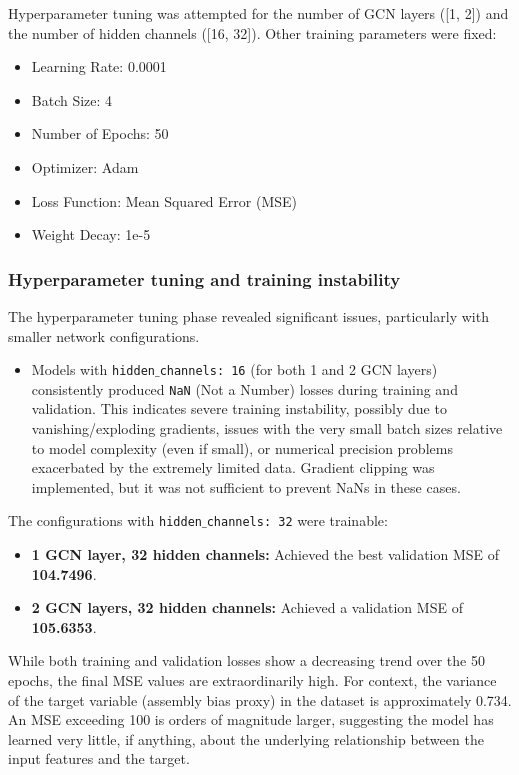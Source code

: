\documentclass[twocolumn]{aastex631}
\begin{document}
Hyperparameter tuning was attempted for the number of GCN layers ([1, 2]) and the number of hidden channels ([16, 32]). Other training parameters were fixed:
\begin{itemize}
    \item Learning Rate: 0.0001
    \item Batch Size: 4
    \item Number of Epochs: 50
    \item Optimizer: Adam
    \item Loss Function: Mean Squared Error (MSE)
    \item Weight Decay: 1e-5
\end{itemize}

\subsubsection{Hyperparameter tuning and training instability}
The hyperparameter tuning phase revealed significant issues, particularly with smaller network configurations.
\begin{itemize}
    \item Models with \texttt{hidden\ensuremath{\_}channels: 16} (for both 1 and 2 GCN layers) consistently produced \texttt{NaN} (Not a Number) losses during training and validation. This indicates severe training instability, possibly due to vanishing/exploding gradients, issues with the very small batch sizes relative to model complexity (even if small), or numerical precision problems exacerbated by the extremely limited data. Gradient clipping was implemented, but it was not sufficient to prevent NaNs in these cases.
\end{itemize}

The configurations with \texttt{hidden\ensuremath{\_}channels: 32} were trainable:
\begin{itemize}
    \item \textbf{1 GCN layer, 32 hidden channels:} Achieved the best validation MSE of \textbf{104.7496}.
    \item \textbf{2 GCN layers, 32 hidden channels:} Achieved a validation MSE of \textbf{105.6353}.
\end{itemize}

While both training and validation losses show a decreasing trend over the 50 epochs, the final MSE values are extraordinarily high. For context, the variance of the target variable (assembly bias proxy) in the dataset is approximately 0.734. An MSE exceeding 100 is orders of magnitude larger, suggesting the model has learned very little, if anything, about the underlying relationship between the input features and the target.
\end{document}
